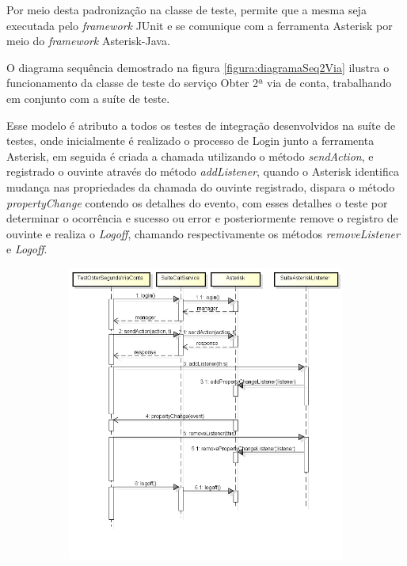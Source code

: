Por meio desta padronização na classe de teste, permite que a mesma seja executada pelo \textit{framework} JUnit e se comunique com a ferramenta Asterisk por meio do \textit{framework} Asterisk-Java.

O diagrama sequência demostrado na figura \ref{figura:diagramaSeq2Via} ilustra o funcionamento da classe de teste do serviço Obter 2ª via de conta, trabalhando em conjunto com a suíte de teste.

Esse modelo é atributo a todos os testes de integração desenvolvidos na suíte de testes, onde inicialmente é realizado o processo de Login junto a ferramenta Asterisk, em seguida é criada a chamada utilizando o método \textit{sendAction}, e registrado o ouvinte através do método \textit{addListener}, quando o Asterisk identifica mudança nas propriedades da chamada do ouvinte registrado, dispara o método \textit{propertyChange} contendo os detalhes do evento, com esses detalhes o teste por determinar o ocorrência e sucesso ou error e posteriormente remove o registro de ouvinte e realiza o \textit{Logoff}, chamando respectivamente os métodos \textit{removeListener} e \textit{Logoff}.

\begin{figure}[H]
	\centering
	\caption{Diagrama de sequência utilizando a suíte de teste.}
	\label{figura:diagramaSeq2Via}
	\begin{subfigure}[H]{\textwidth}
		\centering
		\includegraphics{figuras/diagramaSequenciaObter2Via.png}
	\end{subfigure}
\end{figure}


